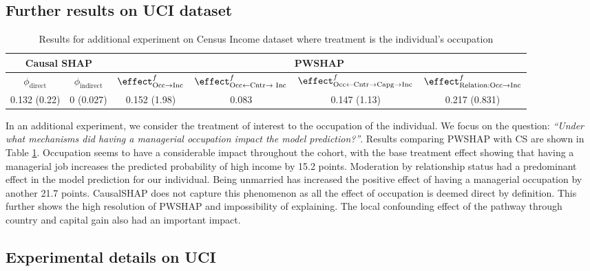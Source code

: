 \subsection{Further results on UCI dataset}

\begin{table}
\begin{tabular}{cccccc}
\hline
\toprule
\multicolumn{2}{c}{Causal SHAP} & \multicolumn{4}{c}{ PWSHAP}  \\
\midrule
$\phi_{\text{direct}}$    & $\phi_{\text{indirect}}$    & $\effect^{f}_{\text{Occ} \rightarrow \text{Inc}}$  & $\effect^{f}_{\text{Occ} \leftarrow \text{Cntr} \rightarrow \text{ Inc}}$  & $\effect^{f}_{\text{Occ} \leftarrow \text{Cntr} \rightarrow  \text{Capg} \rightarrow \text{Inc}}$  & $\effect^{f}_{ \text{Relation:} \text{Occ} \rightarrow \text{Inc}}$ \\
\small 0.132 (0.22)             & \small 0  (0.027)             & \small 0.152 (1.98)     & \small 0.083     & \small 0.147 (1.13)    & \small 0.217  (0.831)  \\ \bottomrule
\end{tabular}%
\caption{Results for additional experiment on Census Income dataset where treatment is the individual's occupation}
\label{tab:uci_occ}
\end{table}

In an additional experiment, we consider the treatment of interest to the occupation of the individual. We focus on the question: \textit{``Under what mechanisms did having a managerial occupation impact the model prediction?''}. Results comparing PWSHAP with CS are shown in Table \ref{tab:uci_occ}. Occupation seems to have a considerable impact throughout the cohort, with the base treatment effect showing that having a managerial job increases the predicted probability of high income by 15.2 points. Moderation by relationship status had a predominant effect in the model prediction for our individual. Being unmarried has increased the positive effect of having a managerial occupation by another 21.7 points. CausalSHAP does not capture this phenomenon as all the effect of occupation is deemed direct by definition. This further shows the high resolution of PWSHAP and impossibility of explaining. The local confounding effect of the pathway through country and capital gain also had an important impact.


\subsection{Experimental details on UCI}

